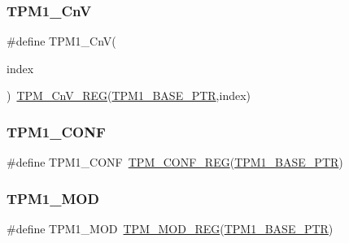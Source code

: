 \subsubsection{\texorpdfstring{T\+P\+M1\+\_\+\+CnV}{TPM1\_CnV}}
{\footnotesize\ttfamily \#define T\+P\+M1\+\_\+\+CnV(\begin{DoxyParamCaption}\item[{}]{index }\end{DoxyParamCaption})~\hyperlink{group___t_p_m___register___accessor___macros_gaf87163e32c337d1f46724110a85e8ea2}{T\+P\+M\+\_\+\+Cn\+V\+\_\+\+R\+EG}(\hyperlink{group___t_p_m___peripheral_ga3c3f533f8c87c74f2bbc3a4de83d1181}{T\+P\+M1\+\_\+\+B\+A\+S\+E\+\_\+\+P\+TR},index)}

\mbox{\label{group___t_p_m___register___accessor___macros_ga2a62a1eba469e400fa3fa8d94577bc36}} 
\subsubsection{\texorpdfstring{T\+P\+M1\+\_\+\+C\+O\+NF}{TPM1\_CONF}}
{\footnotesize\ttfamily \#define T\+P\+M1\+\_\+\+C\+O\+NF~\hyperlink{group___t_p_m___register___accessor___macros_ga6c809a9824dbb88125be858cc3f362fd}{T\+P\+M\+\_\+\+C\+O\+N\+F\+\_\+\+R\+EG}(\hyperlink{group___t_p_m___peripheral_ga3c3f533f8c87c74f2bbc3a4de83d1181}{T\+P\+M1\+\_\+\+B\+A\+S\+E\+\_\+\+P\+TR})}

\mbox{\label{group___t_p_m___register___accessor___macros_ga67a3cba0336f4f9aff488c717a773cb4}} 
\subsubsection{\texorpdfstring{T\+P\+M1\+\_\+\+M\+OD}{TPM1\_MOD}}
{\footnotesize\ttfamily \#define T\+P\+M1\+\_\+\+M\+OD~\hyperlink{group___t_p_m___register___accessor___macros_ga549fa5a6fe75d15bb21ae1a3925047c7}{T\+P\+M\+\_\+\+M\+O\+D\+\_\+\+R\+EG}(\hyperlink{group___t_p_m___peripheral_ga3c3f533f8c87c74f2bbc3a4de83d1181}{T\+P\+M1\+\_\+\+B\+A\+S\+E\+\_\+\+P\+TR})}

